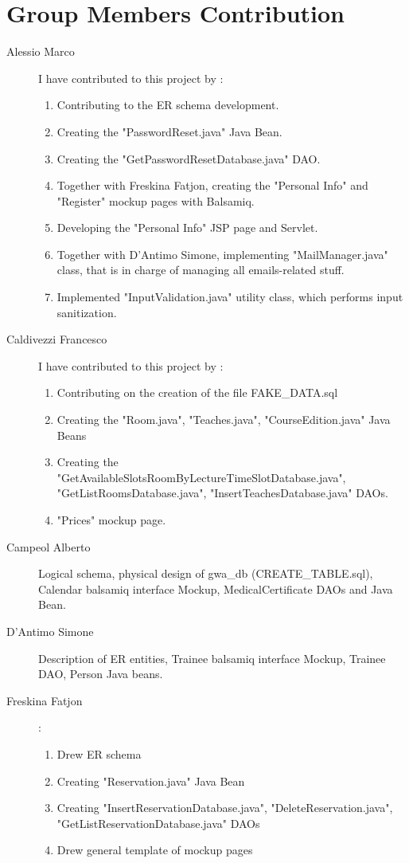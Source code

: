 \section{Group Members Contribution}


\begin{description}
	\item[Alessio Marco] I have contributed to this project by :
    	\begin{enumerate}
    	    \item Contributing to the ER schema development.
    	    \item Creating the "PasswordReset.java" Java Bean.
    	    \item Creating the "GetPasswordResetDatabase.java" DAO.
    	    \item Together with Freskina Fatjon, creating the "Personal Info" and "Register" mockup pages with Balsamiq.
    	    \item Developing the "Personal Info" JSP page and Servlet.
    	    \item Together with D'Antimo Simone, implementing "MailManager.java" class, that is in charge of managing all emails-related stuff.
    	    \item Implemented "InputValidation.java" utility class, which performs input sanitization.
    	\end{enumerate}
	\item[Caldivezzi Francesco] I have contributed to this project by :
	\begin{enumerate}
		\item Contributing on the creation of the file FAKE_DATA.sql
		\item Creating the "Room.java", "Teaches.java", "CourseEdition.java" Java Beans
		\item Creating the "GetAvailableSlotsRoomByLectureTimeSlotDatabase.java", "GetListRoomsDatabase.java", "InsertTeachesDatabase.java" DAOs.
		\item "Prices" mockup page.		
	\end{enumerate}
	\item[Campeol Alberto] Logical schema, physical design of gwa\_db (CREATE_TABLE.sql), Calendar balsamiq interface Mockup, MedicalCertificate DAOs and Java Bean.
	\item[D'Antimo Simone] Description of ER entities, Trainee balsamiq interface Mockup, Trainee DAO, Person Java beans.
	\item[Freskina Fatjon] :
	\begin{enumerate}
		\item Drew ER schema 
		\item Creating "Reservation.java" Java Bean 
		\item Creating "InsertReservationDatabase.java", "DeleteReservation.java", "GetListReservationDatabase.java" DAOs
		\item Drew general template of mockup pages 
	\end{enumerate} 


\end{description}
